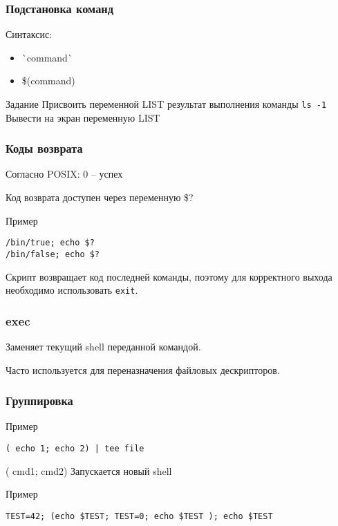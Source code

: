 \begin{frame}
	\frametitle{Подстановка команд}
	
	Синтаксис:

	\begin{itemize}
		\item \`{}command\`{}
		\item \$(command)
	\end{itemize}
	\pause
	\begin{block}{Задание}
		Присвоить переменной LIST результат выполнения команды {\tt ls -1} \\
		Вывести на экран переменную LIST
	\end{block}
\end{frame}

\begin{frame}[fragile]
	\frametitle{Коды возврата}

	Согласно POSIX: 0 -- успех

	Код возврата доступен через переменную \$?

	\pause
	\begin{block}{Пример}
		\begin{lstlisting}
/bin/true; echo $?
/bin/false; echo $?
		\end{lstlisting}
	\end{block}

	Скрипт возвращает код последней команды, поэтому для корректного выхода необходимо использовать {\tt exit}.

\end{frame}


\begin{frame}
	\frametitle{exec}

	Заменяет текущий shell переданной командой. 

	Часто используется для переназначения файловых дескрипторов.

\end{frame}

\begin{frame}[fragile]
	\frametitle{Группировка}
	
	\begin{block}{Пример}
		\begin{lstlisting}
( echo 1; echo 2) | tee file
		\end{lstlisting}
	\end{block}

	\pause
	\begin{block}{( cmd1; cmd2)}
	    Запускается новый shell
	\end{block}

	\begin{block}{Пример}
		\begin{lstlisting}
TEST=42; (echo $TEST; TEST=0; echo $TEST ); echo $TEST
		\end{lstlisting}
	\end{block}

\end{frame}



